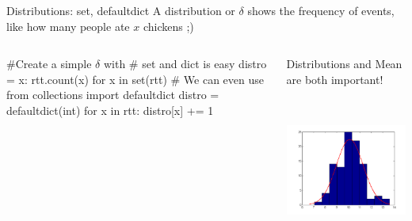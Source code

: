 \begin{pyframe}{Distributions: set, defaultdict}
A distribution or $\delta$ shows the frequency of events, like 
how many people ate $x$ chickens ;)
\begin{columns}
\begin{pycode}
#Create a simple $\delta$ with
#    set and dict is easy
distro = {x: rtt.count(x) 
    for x in set(rtt)}
# We can even use
from collections import defaultdict
distro = defaultdict(int)
for x in rtt:
    distro[x] += 1
    


\end{pycode}
\footnotesize
Distributions and Mean are both important!
\includegraphics[height=5.5cm, width=7cm]{histo_gauss.pdf}
\end{columns}
\end{pyframe}

